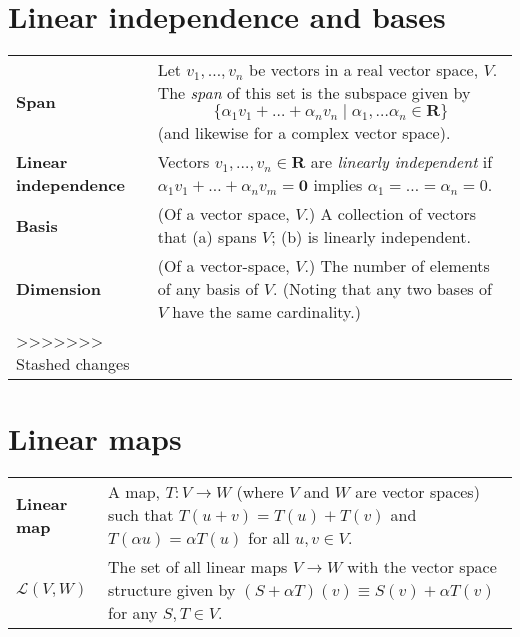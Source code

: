\documentclass[10pt, a4paper, landscape]{article}
\newcommand{\defn}[1]{\textbf{#1}}
\newcommand{\set}[1]{\mathbold{#1}}
\begin{document}
\begin{multicols*}{3}
\section*{Linear independence and bases}
\begin{tabularx}{\columnwidth}{@{}l>{\raggedright\arraybackslash}X@{}}
  \toprule

  \defn{Span} & Let $v_1, \dots, v_n$ be vectors in a real vector space,
  $V$. The \emph{span} of this set is the subspace given by
  \begin{equation*}
    \{ \alpha_1 v_1 +\dots + \alpha_n v_n \mid \alpha_1, \dots \alpha_n\in\set{R} \}
  \end{equation*}
  (and likewise for a complex vector space). \\

  \parbox[t]{0.8in}{\defn{Linear\\ independence}} & Vectors $v_1, \dots, v_n \in \set{R}$ are \emph{linearly independent} if $\alpha_1 v_1 + \dots + \alpha_n v_m = \set{0}$ implies $\alpha_1 = \dots = \alpha_n=0$. \\

  \defn{Basis} & (Of a vector space, $V$.) A collection of vectors that (a) spans $V$; (b) is linearly independent. \\

  \defn{Dimension} & (Of a vector-space, $V$.) The number of elements of any basis of $V$. (Noting that any two bases of $V$ have the same cardinality.) \\
>>>>>>> Stashed changes
  
\end{tabularx}


\section*{Linear maps}
\begin{tabularx}{\columnwidth}{@{}l>{\raggedright\arraybackslash}X@{}}
  \toprule

  \defn{Linear map} & A map, $T\colon V\to W$ (where $V$ and $W$ are
  vector spaces) such that $T(u+v) = T(u)+T(v)$ and $T(\alpha u) = \alpha T(u)$
  for all $u,v\in V$. \\

  $\mathcal{L}(V, W)$ & The set of all linear maps $V\to W$ with the vector space structure given by $(S+\alpha T)(v) \equiv S(v)+\alpha T(v)$ for any $S,T\in V$. \\


\end{tabularx}
\end{multicols*}
\end{document}
